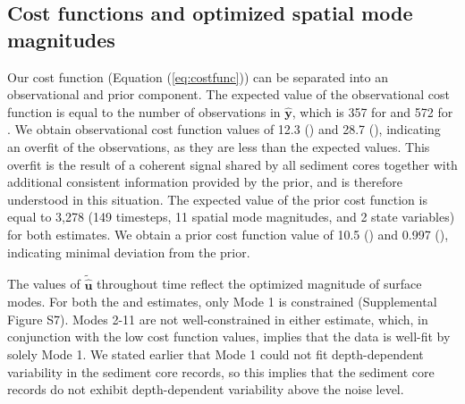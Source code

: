 \documentclass[draft]{agujournal2019}
\begin{document}
\subsection{Cost functions and optimized spatial mode magnitudes \label{sec:solchar}}
Our cost function (Equation (\ref{eq:costfunc}))
can be separated into an observational and prior component.
The expected value of the
observational cost function is equal to the number of observations in
$\mathbf{\hat{y}}$, which is 357 for  and 572 for
. 
We obtain observational cost function values of 12.3 () and
28.7 (), indicating
an overfit of the observations, as they are less than the expected
values. This overfit is the result of a coherent
signal shared by
all sediment cores
together with additional
consistent information provided by the prior, and is
therefore understood in this situation. The expected value of the
prior cost function is equal to 3,278 (149 timesteps, 11 spatial
mode magnitudes, and 2 state variables) for both estimates. We obtain a
prior cost function value of
10.5 () and 0.997 (), indicating
minimal deviation from the prior.

The values of $\mathbf{\tilde{\hat{u}}}$ throughout time reflect the
optimized magnitude of surface modes. For both the
 and  estimates, only Mode 1 is
constrained (Supplemental Figure S7).
Modes 2-11 are not well-constrained in either estimate, which, in conjunction
with the low cost function values, implies that the data is
well-fit by solely Mode 1. We stated earlier that Mode 1 could not fit
depth-dependent variability in the sediment core records, so this
implies that the sediment core records do not exhibit depth-dependent
variability above the noise level.
\end{document}
